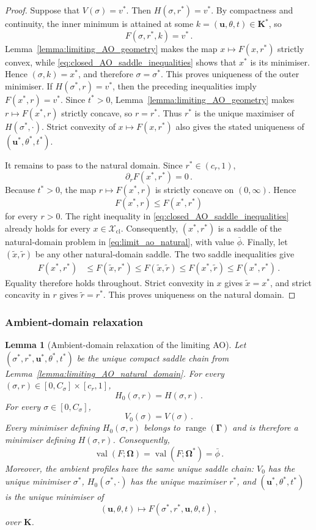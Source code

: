\documentclass{article}
\newtheorem{lemma}{Lemma}
\theoremstyle{definition}
\newcommand*{\bb}{\boldsymbol}
\def\bu{\bb{u}}
\newcommand{\range}{\operatorname{range}}
\begin{document}
\begin{bibunit}
\begin{proof}
Suppose that $V(\sigma)=v^*$. Then
$H(\sigma,r^*)=v^*$. By compactness and continuity, the inner minimum is
attained at some $k=(\bu,\theta,t)\in\bb K^*$, so
$$
    F(\sigma,r^*,k)
    =
    v^*\,.
$$
Lemma~\ref{lemma:limiting_AO_geometry} makes the map
$x\mapsto F(x,r^*)$ strictly convex, while
\eqref{eq:closed_AO_saddle_inequalities} shows that $x^*$ is its
minimiser. Hence $(\sigma,k)=x^*$, and therefore $\sigma=\sigma^*$.
This proves uniqueness of the outer minimiser.
If $H(\sigma^*,r)=v^*$, then the preceding inequalities imply
$F(x^*,r)=v^*$. Since $t^*>0$,
Lemma~\ref{lemma:limiting_AO_geometry} makes
$r\mapsto F(x^*,r)$ strictly concave, so $r=r^*$. Thus $r^*$ is the
unique maximiser of $H(\sigma^*,\cdot)$. Strict convexity of
$x\mapsto F(x,r^*)$ also gives the stated uniqueness of
$(\bu^*,\theta^*,t^*)$.

It remains to pass to the natural domain. Since
$r^*\in(c_r,1)$,
$$
    \partial_rF(x^*,r^*)=0\,.
$$
Because $t^*>0$, the map $r\mapsto F(x^*,r)$ is strictly concave on
$(0,\infty)$. Hence
$$
    F(x^*,r)
    \leq
    F(x^*,r^*)
$$
for every $r>0$. The right inequality in
\eqref{eq:closed_AO_saddle_inequalities} already holds for every
$x\in\mathcal X_{\mathrm{cl}}$. Consequently, $(x^*,r^*)$ is a saddle
of the natural-domain problem in \eqref{eq:limit_ao_natural}, with value
$\bar\phi$.
Finally, let $(\widetilde x,\widetilde r)$ be any other natural-domain
saddle. The two saddle inequalities give
$$
\begin{aligned}
    F(x^*,r^*)
    &\leq
    F(\widetilde x,r^*)
    \leq
    F(\widetilde x,\widetilde r)
    \leq
    F(x^*,\widetilde r)
    \leq
    F(x^*,r^*)\,.
\end{aligned}
$$
Equality therefore holds throughout. Strict convexity in $x$ gives
$\widetilde x=x^*$, and strict concavity in $r$ gives
$\widetilde r=r^*$. This proves uniqueness on the natural domain.
\end{proof}

\subsubsection{Ambient-domain relaxation}

\begin{lemma}[Ambient-domain relaxation of the limiting AO]
\label{lemma:ambient_limiting_saddle_chain}
Let $(\sigma^*,r^*,\bu^*,\theta^*,t^*)$ be the unique compact saddle
chain from Lemma~\ref{lemma:limiting_AO_natural_domain}. For every
$(\sigma,r)\in[0,C_\sigma]\times[c_r,1]$,
$$
    H_0(\sigma,r)=H(\sigma,r)\,.
$$
For every $\sigma\in[0,C_\sigma]$,
$$
    V_0(\sigma)=V(\sigma)\,.
$$
Every minimiser defining $H_0(\sigma,r)$ belongs to
$\range(\bb\Gamma)$ and is therefore a minimiser defining
$H(\sigma,r)$. Consequently,
$$
    \operatorname{val}(F;\bb\Omega)
    =
    \operatorname{val}(F;\bb\Omega^*)
    =
    \bar\phi\,.
$$
Moreover, the ambient profiles have the same unique saddle chain: $V_0$
has the unique minimiser $\sigma^*$, $H_0(\sigma^*,\cdot)$ has the unique
maximiser $r^*$, and $(\bu^*,\theta^*,t^*)$ is the unique minimiser of
$$
    (\bu,\theta,t)
    \longmapsto
    F(\sigma^*,r^*,\bu,\theta,t)\,,
$$
over $\bb K$.
\end{lemma}


\end{bibunit}
\end{document}
